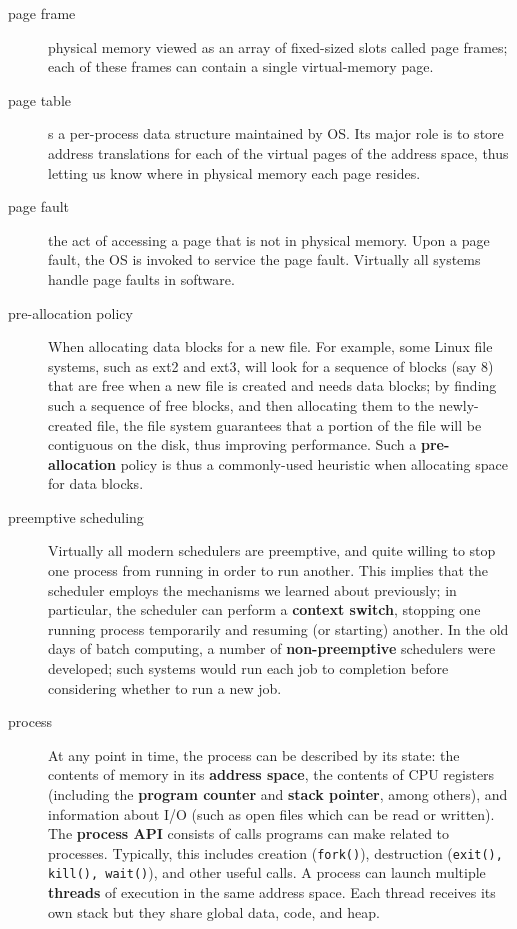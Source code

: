 \begin{description}
\item[page frame] physical memory viewed as an array of fixed-sized slots called page frames; each of these frames can contain a single virtual-memory page.

\item[page table] s a per-process data structure maintained by OS.  Its major role is to store address translations for each of the virtual pages of the address space, thus letting us know where in physical memory each page resides.

\item[page fault] the act of accessing a page that is not in physical memory.  Upon a page fault, the OS is invoked to service the page fault.  Virtually all systems handle page faults in software.

\item[pre-allocation policy] When allocating data blocks for a new file. For example, some Linux file systems, such as ext2 and ext3, will look for a sequence of blocks (say 8) that are free when a new file is created and needs data blocks; by finding such a sequence of free blocks, and then allocating them to the newly-created file, the file system guarantees that a portion of the file will be contiguous on the disk, thus improving performance. Such a \textbf{pre-allocation} policy is thus a commonly-used heuristic when allocating space for data blocks.

\item[preemptive scheduling] Virtually all modern schedulers are preemptive, and quite willing to stop one process from running in order to run another. This implies that the scheduler employs the mechanisms we learned about previously; in particular, the scheduler can perform a \textbf{context switch}, stopping one running process temporarily and resuming (or starting) another. In the old days of batch computing, a number of \textbf{non-preemptive} schedulers were developed; such systems would run each job to completion before considering whether to run a new job.

\item[process] At any point in time, the process can be described by its state: the contents of memory in its \textbf{address space}, the contents of CPU registers (including the \textbf{program counter} and \textbf{stack pointer}, among others), and information about I/O (such as open files which can be read or written). The \textbf{process API} consists of calls programs can make related to processes. Typically, this includes creation (\texttt{fork()}), destruction (\texttt{exit(), kill(), wait()}), and other useful calls. A process can launch multiple \textbf{threads} of execution in the same address space. Each thread receives its own stack but they share global data, code, and heap.


\end{description}

